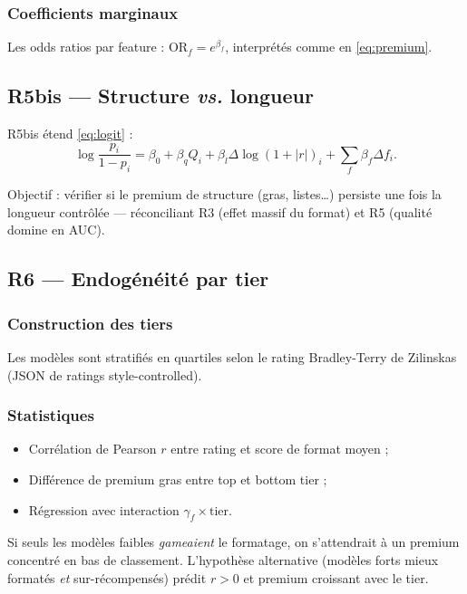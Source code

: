 \documentclass[11pt,a4paper]{article}
\begin{document}
\subsubsection{Coefficients marginaux}

Les odds ratios par feature :
$\text{OR}_f = e^{\beta_f}$, interprétés comme en \eqref{eq:premium}.

\subsection{R5bis --- Structure \emph{vs.} longueur}

R5bis étend \eqref{eq:logit} :
\begin{equation}
  \log\frac{p_i}{1-p_i} = \beta_0 + \beta_q Q_i + \beta_l \Delta\log(1+|r|)_i + \sum_f \beta_f \Delta f_i.
  \label{eq:logit-r5bis}
\end{equation}

Objectif : vérifier si le premium de structure (gras, listes\ldots) persiste une
fois la longueur contrôlée --- réconciliant R3 (effet massif du format) et R5
(qualité domine en AUC).

\subsection{R6 --- Endogénéité par tier}

\subsubsection{Construction des tiers}

Les modèles sont stratifiés en quartiles selon le rating Bradley-Terry de
Zilinskas (JSON de ratings style-controlled).

\subsubsection{Statistiques}

\begin{itemize}[noitemsep]
  \item Corrélation de Pearson $r$ entre rating et score de format moyen ;
  \item Différence de premium gras entre top et bottom tier ;
  \item Régression avec interaction $\gamma_f \times \text{tier}$.
\end{itemize}

Si seuls les modèles faibles \emph{gameaient} le formatage, on s'attendrait à un
premium concentré en bas de classement. L'hypothèse alternative (modèles forts
mieux formatés \emph{et} sur-récompensés) prédit $r > 0$ et premium croissant avec le tier.
\end{document}
